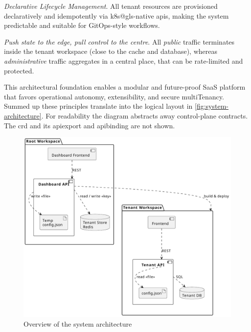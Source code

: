 \documentclass[11pt, a4paper, oneside, listof=totoc]{scrartcl}
\begin{document}
\begin{enumerate}[label={[\arabic*]:},
                    ref=Challenge~\arabic*,
                    leftmargin=*,
                    itemsep=0.6\baselineskip]
                    \item\label{chal:declarativeLifecycle}
                        \textit{Declarative Lifecycle Management}.
                        All tenant resources are provisioned declaratively and idempotently via
                        \gls{k8s@gls}-native \glspl{api}, making the system predictable and suitable
                        for GitOps-style workflows.

                    \item\label{chal:pushState}
                        \textit{Push state to the edge, pull control to the centre}.
                        All \textit{public} traffic terminates inside the tenant workspace
                        (close to the cache and database), whereas \textit{administrative} traffic
                        aggregates in a central place, that can be rate-limited and protected.

                \end{enumerate}

                This architectural foundation enables a modular and future-proof SaaS platform that
                favors operational autonomy, extensibility, and secure \gls{multiTenancy}.
                \\
                Summed up these principles translate into the logical layout in
                \autoref{fig:system-architecture}.
                For readability the diagram abstracts away control-plane contracts.
                The \gls{crd} and its \gls{apiexport} and \gls{apibinding} are not shown.

                \vspace{0.5cm}
                \begin{figure}[H]
                    \centering
                    \includegraphics[scale=0.75]{images/WorkspaceArchitecture.pdf}
                    \caption{Overview of the system architecture}\label{fig:system-architecture}
                \end{figure}
\end{document}
